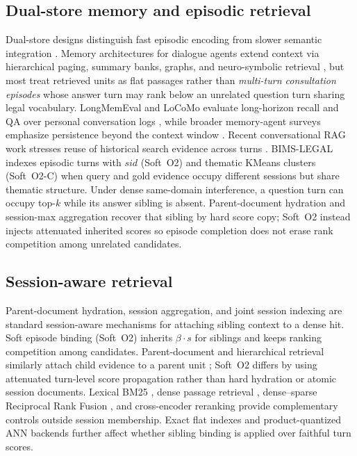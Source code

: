 \documentclass[preprint,12pt,authoryear]{elsarticle}
\begin{document}
\subsection{Dual-store memory and episodic retrieval}
Dual-store designs distinguish fast episodic encoding from slower semantic integration \cite{mcclelland1995complementary, kumaran2016, tulving1972episodic, atkinson1971control}.
Memory architectures for dialogue agents extend context via hierarchical paging, summary banks, graphs, and neuro-symbolic retrieval \cite{packer2023memgpt, zhong2024memorybank, rasmussen2025zep, gutierrez2024hipporag, modarressi2023ret, wang2024memoryllm, lewis2020rag, wu2025memory}, but most treat retrieved units as flat passages rather than \emph{multi-turn consultation episodes} whose answer turn may rank below an unrelated question turn sharing legal vocabulary.
LongMemEval and LoCoMo evaluate long-horizon recall and QA over personal conversation logs \cite{wu2025longmemeval, maharana2024evaluating}, while broader memory-agent surveys emphasize persistence beyond the context window \cite{wu2025memory, Tan2025}.
Recent conversational RAG work stresses reuse of historical search evidence across turns \cite{mo2026historical}.
BIMS-LEGAL indexes episodic turns with $sid$ (Soft~O2) and thematic KMeans clusters (Soft~O2-C) when query and gold evidence occupy different sessions but share thematic structure.
Under dense same-domain interference, a question turn can occupy top-$k$ while its answer sibling is absent.
Parent-document hydration and session-max aggregation recover that sibling by hard score copy; Soft~O2 instead injects attenuated inherited scores so episode completion does not erase rank competition among unrelated candidates.

\subsection{Session-aware retrieval}
Parent-document hydration, session aggregation, and joint session indexing are standard session-aware mechanisms for attaching sibling context to a dense hit.
Soft episode binding (Soft~O2) inherits $\beta\cdot s$ for siblings and keeps ranking competition among candidates. Parent-document and hierarchical retrieval similarly attach child evidence to a parent unit \cite{callan1994passage,dai2019context,zaheer2017deep,karpukhin2020dpr}; Soft~O2 differs by using attenuated turn-level score propagation rather than hard hydration or atomic session documents.
Lexical BM25 \cite{robertson2009bm25}, dense passage retrieval \cite{karpukhin2020dpr}, dense--sparse Reciprocal Rank Fusion \cite{cormack2009rrf}, and cross-encoder reranking \cite{nogueira2019multistage, chen2024bge} provide complementary controls outside session membership.
Exact flat indexes and product-quantized ANN backends \cite{johnson2019billion} further affect whether sibling binding is applied over faithful turn scores.
\end{document}
